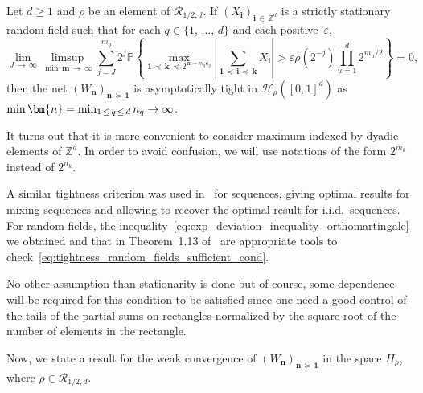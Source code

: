 \documentclass[AHL,Unicode,longabstracts,published]{cedram}
\newcommand{\Rca}{\mathcal{R}}
\newcommand{\clH}{\mathcal{H}}
\newcommand\PP{\mathbb{P}}
\newcommand\Z{\mathbb{Z}}
\newcommand\ens[1]{\{ #1\}}
\newcommand{\pr}[1]{(#1)}
\newcommand{\gr}[1]{\bm{#1}}
\newcommand{\gri}{\bm{i}}
\newcommand{\grn}{\bm{n}}
\newcommand{\grm}{\bm{m}}
\newcommand{\grk}{\bm{k}}
\newcommand{\imd}{\preccurlyeq}
\newcommand{\smd}{\succcurlyeq }
\begin{document}
\begin{prop}\label{prop:tightness_partial_sums}
Let $d\geq 1$ and $\rho$ be an element of $\Rca_{1/2,d}$. If $\pr{X_{\gri}}_{\gri\,\in\,\Z^d}$ is a strictly stationary random field such that for each $q\in \ens{1,\,\dots,\,d}$ and each positive~$\varepsilon$,
\begin{equation}\label{eq:tightness_random_fields_sufficient_cond}
\lim_{J\,\to\,\infty}\limsup_{\min\,\grm\,\to\,\infty}
\sum_{j=J}^{m_q}2^j \PP\left\{\max_{\gr{1}\,\imd\,\gr{k}\,\imd\,2^{\grm -m_q\gr{e}_q } }
\left|\sum_{\gr{1}\,\imd\,\gri\,\imd\,\grk} X_{\gri} \right|> \varepsilon\rho\left(2^{-j}\right)
\prod_{u=1}^d2^{m_u/2}\right\}=0,
\end{equation}
then the net $(W_{\grn})_{\grn\,\smd\, \gr{1}}$ is asymptotically tight in $\clH_{\rho}([0,1]^d)$ as $\min\grn=
\min_{1\,\leq\,q\,\leq\,d}n_q\linebreak\to\infty$.
\end{prop}

It turns out that it is more convenient to consider maximum indexed by dyadic elements of $\Z^d$. In order to avoid confusion, we will use notations of the form $2^{m_k}$ instead of $2^{n_k}$.


A similar tightness criterion was used in~\cite{MR3615086} for sequences, giving optimal results for mixing sequences and allowing to recover the optimal result for i.i.d.\ sequences. For random fields, the inequality~\eqref{eq:exp_deviation_inequality_orthomartingale} we obtained and that in Theorem~1.13 of~\cite{MR4046858} are appropriate tools to check~\eqref{eq:tightness_random_fields_sufficient_cond}.


No other assumption than stationarity is done but of course, some dependence will be required for this condition to be satisfied since one need a good control of the tails of the partial sums on rectangles normalized by the square root of the number of elements in the rectangle.

Now, we state a result for the weak convergence of $\pr{W_{\grn}}_{\grn\,\smd\,\gr{1}}$ in the space $H_\rho$, where $\rho\in\Rca_{1/2,d}$.
\end{document}
